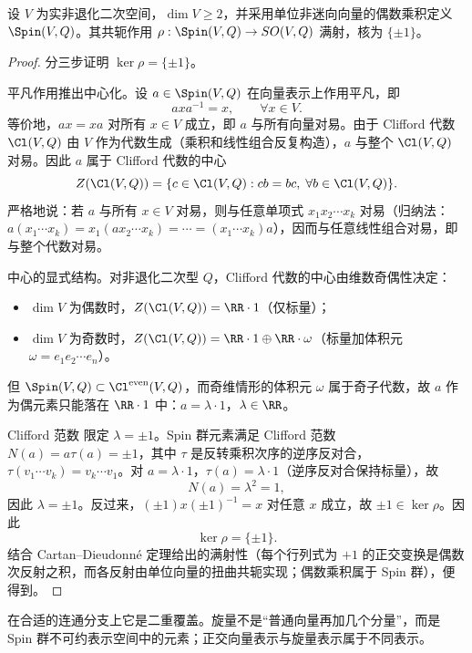 \begin{theorem}
设 $V$ 为实非退化二次空间，$\dim V\ge2$，并采用单位非迷向向量的偶数乘积定义 $\Spin(V,Q)$。其共轭作用 $\rho:\Spin(V,Q)\to SO(V,Q)$ 满射，核为 $\{\pm1\}$。
\end{theorem}
\begin{proof}
分三步证明 $\ker\rho=\{\pm1\}$。

平凡作用推出中心化。设 $a\in\Spin(V,Q)$ 在向量表示上作用平凡，即
\[
 axa^{-1}=x,\qquad \forall x\in V.
\]
等价地，$ax=xa$ 对所有 $x\in V$ 成立，即 $a$ 与所有向量对易。由于 Clifford 代数 $\Cl(V,Q)$ 由 $V$ 作为代数生成（乘积和线性组合反复构造），$a$ 与整个 $\Cl(V,Q)$ 对易。因此 $a$ 属于 Clifford 代数的中心
\[
 Z(\Cl(V,Q))=\{c\in\Cl(V,Q):cb=bc,\;\forall b\in\Cl(V,Q)\}.
\]
严格地说：若 $a$ 与所有 $x\in V$ 对易，则与任意单项式 $x_1x_2\cdots x_k$ 对易（归纳法：$a(x_1\cdots x_k)=x_1(a x_2\cdots x_k)=\cdots=(x_1\cdots x_k)a$），因而与任意线性组合对易，即与整个代数对易。

中心的显式结构。对非退化二次型 $Q$，Clifford 代数的中心由维数奇偶性决定：
\begin{itemize}
 \item $\dim V$ 为偶数时，$Z(\Cl(V,Q))=\RR\cdot 1$（仅标量）；
 \item $\dim V$ 为奇数时，$Z(\Cl(V,Q))=\RR\cdot 1\oplus\RR\cdot\omega$（标量加体积元 $\omega=e_1e_2\cdots e_n$）。
\end{itemize}
但 $\Spin(V,Q)\subset\Cl^{\rm even}(V,Q)$，而奇维情形的体积元 $\omega$ 属于奇子代数，故 $a$ 作为偶元素只能落在 $\RR\cdot 1$ 中：$a=\lambda\cdot 1$，$\lambda\in\RR$。

Clifford 范数 限定 $\lambda=\pm1$。Spin 群元素满足 Clifford 范数 $N(a)=a\tau(a)=\pm1$，其中 $\tau$ 是反转乘积次序的逆序反对合，$\tau(v_1\cdots v_k)=v_k\cdots v_1$。对 $a=\lambda\cdot 1$，$\tau(a)=\lambda\cdot1$（逆序反对合保持标量），故
\[
 N(a)=\lambda^2=1,
\]
因此 $\lambda=\pm 1$。反过来，$(\pm1)x(\pm1)^{-1}=x$ 对任意 $x$ 成立，故 $\pm1\in\ker\rho$。因此
\[
 \ker\rho=\{\pm1\}.
\]
结合 Cartan--Dieudonn\'e 定理给出的满射性（每个行列式为 $+1$ 的正交变换是偶数次反射之积，而各反射由单位向量的扭曲共轭实现；偶数乘积属于 Spin 群），便得到。
\end{proof}

在合适的连通分支上它是二重覆盖。旋量不是“普通向量再加几个分量”，而是 Spin 群不可约表示空间中的元素；正交向量表示与旋量表示属于不同表示。

